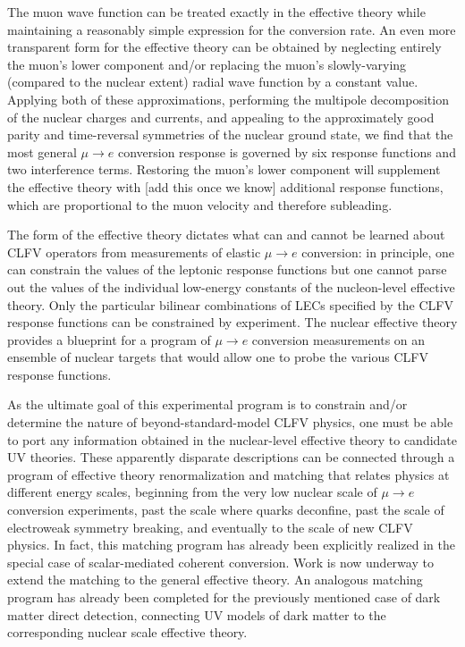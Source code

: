 \documentclass{book}[letterpaper,12pt]
\begin{document}
The muon wave function can be treated exactly in the effective theory while maintaining a reasonably simple expression for the conversion rate. An even more transparent form for the effective theory can be obtained by neglecting entirely the muon's lower component and/or replacing the muon's slowly-varying (compared to the nuclear extent) radial wave function by a constant value. Applying both of these approximations, performing the multipole decomposition of the nuclear charges and currents, and appealing to the approximately good parity and time-reversal symmetries of the nuclear ground state, we find that the most general $\mu\rightarrow e$ conversion response is governed by six response functions and two interference terms. Restoring the muon's lower component will supplement the effective theory with [add this once we know] additional response functions, which are proportional to the muon velocity and therefore subleading.

The form of the effective theory dictates what can and cannot be learned about CLFV operators from measurements of elastic $\mu\rightarrow e$ conversion: in principle, one can constrain the values of the leptonic response functions but one cannot parse out the values of the individual low-energy constants of the nucleon-level effective theory. Only the particular bilinear combinations of LECs specified by the CLFV response functions can be constrained by experiment. The nuclear effective theory provides a blueprint for a program of $\mu\rightarrow e$ conversion measurements on an ensemble of nuclear targets that would allow one to probe the various CLFV response functions.

As the ultimate goal of this experimental program is to constrain and/or determine the nature of beyond-standard-model CLFV physics, one must be able to port any information obtained in the nuclear-level effective theory to candidate UV theories. These apparently disparate descriptions can be connected through a program of effective theory renormalization and matching that relates physics at different energy scales, beginning from the very low nuclear scale of $\mu\rightarrow e$ conversion experiments, past the scale where quarks deconfine, past the scale of electroweak symmetry breaking, and eventually to the scale of new CLFV physics. In fact, this matching program has already been explicitly realized in the special case of scalar-mediated coherent conversion. Work is now underway to extend the matching to the general effective theory. An analogous matching program has already been completed for the previously mentioned case of dark matter direct detection, connecting UV models of dark matter to the corresponding nuclear scale effective theory. 
\end{document}
